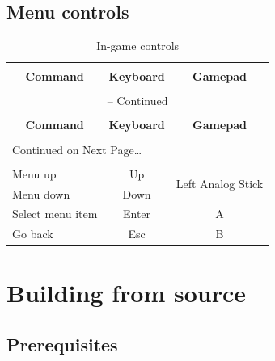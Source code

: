 \documentclass[11pt]{article}
\begin{document}
\subsection{Menu controls}

\begin{center}
\begin{longtable}{lcc}
\caption{In-game controls} \label{ingame-controls-table} \\

\hline \hline \\[-2ex]
   \multicolumn{1}{c}{\textbf{Command}} &
   \multicolumn{1}{c}{\textbf{Keyboard}} &
   \multicolumn{1}{c}{\textbf{Gamepad}} \\[0.5ex] \hline
   \\[-1.8ex]
\endfirsthead

\multicolumn{3}{c}{{\tablename} \thetable{} -- Continued} \\[0.5ex]
  \hline \hline \\[-2ex]
  \multicolumn{1}{c}{\textbf{Command}} &
  \multicolumn{1}{c}{\textbf{Keyboard}} &
  \multicolumn{1}{c}{\textbf{Gamepad}} \\[0.5ex] \hline
  \\[-1.8ex]
\endhead

  \multicolumn{3}{l}{{Continued on Next Page\ldots}} \\
\endfoot

  \\[-1.8ex] \hline \hline
\endlastfoot

Menu up & Up & \multirow{2}{*}{Left Analog Stick}\\ 
Menu down & Down \\ 
Select menu item & Enter & A \\ 
Go back & Esc & B \\
\end{longtable}
\end{center}


\section{Building from source}
\label{building-from-source}

\subsection{Prerequisites}
\end{document}
